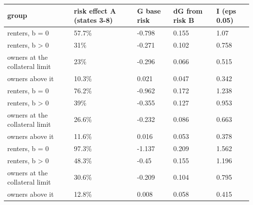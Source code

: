 \begingroup\small
\setlength{\tabcolsep}{3pt}
\renewcommand{\arraystretch}{1.04}
\begin{tabularx}{\linewidth}{XXXXX}
\toprule
group & risk effect A (states 3-8) & G base risk & dG from risk B & I (eps 0.05) \\
\midrule
renters, b = 0 & 57.7\% & -0.798 & 0.155 & 1.07 \\
renters, b \textgreater{} 0 & 31\% & -0.271 & 0.102 & 0.758 \\
owners at the collateral limit & 23\% & -0.296 & 0.066 & 0.515 \\
owners above it & 10.3\% & 0.021 & 0.047 & 0.342 \\
renters, b = 0 & 76.2\% & -0.962 & 0.172 & 1.238 \\
renters, b \textgreater{} 0 & 39\% & -0.355 & 0.127 & 0.953 \\
owners at the collateral limit & 26.6\% & -0.232 & 0.086 & 0.663 \\
owners above it & 11.6\% & 0.016 & 0.053 & 0.378 \\
renters, b = 0 & 97.3\% & -1.137 & 0.209 & 1.562 \\
renters, b \textgreater{} 0 & 48.3\% & -0.45 & 0.155 & 1.196 \\
owners at the collateral limit & 30.6\% & -0.209 & 0.104 & 0.795 \\
owners above it & 12.8\% & 0.008 & 0.058 & 0.415 \\
\bottomrule
\end{tabularx}
\endgroup
